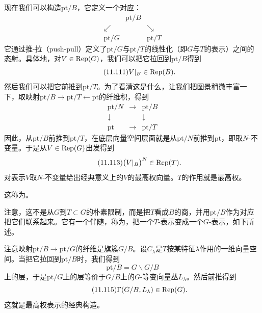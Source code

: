 现在我们可以构造$\mathrm{pt}/B$，它定义一个对应：
\begin{equation}\tag{11.110}
\begin{array}{ccc}
 & \mathrm{pt}/B & \\
 \swarrow & & \searrow\\
 \mathrm{pt}/G & & \mathrm{pt}/T
\end{array}
\end{equation}
它通过推-拉（push-pull）定义了$\mathrm{pt}/G$与$\mathrm{pt}/T$的线性化（即$G$与$T$的表示）之间的态射。具体地，对$V\in\mathrm{Rep}(G)$，我们可以把它拉回到$\mathrm{pt}/B$得到
\begin{equation}\tag{11.111}
V|_{B}\in\mathrm{Rep}(B).
\end{equation}
然后我们可以把它前推到$\mathrm{pt}/T$。为了看清这是什么，让我们把图景稍微丰富一下，取映射$\mathrm{pt}/B\to\mathrm{pt}/T\leftarrow\mathrm{pt}$的纤维积，得到
\begin{equation}\tag{11.112}
\begin{array}{ccc}
\mathrm{pt}/N & \longrightarrow & \mathrm{pt}/B\\
\downarrow & & \downarrow\\
\mathrm{pt} & \longrightarrow & \mathrm{pt}/T
\end{array}
\end{equation}
因此，从$\mathrm{pt}/B$前推到$\mathrm{pt}/T$，在底层向量空间层面就是从$\mathrm{pt}/N$前推到$\mathrm{pt}$，即取$N$-不变量。于是从$V\in\mathrm{Rep}(G)$出发得到
\begin{equation}\tag{11.113}
\bigl(V|_{B}\bigr)^{N}\in\mathrm{Rep}(T).
\end{equation}
对表示$V$取$N$-不变量给出经典意义上的$V$的最高权向量。$T$的作用就是最高权。

这称为。

注意，这不是从$G$到$T\subset G$的朴素限制，而是把$T$看成$B$的商，并用$\mathrm{pt}/B$作为对应把它们联系起来。它有一个伴随，称为，把一个$T$-表示变成一个$G$-表示，如下所述。

注意映射$\mathrm{pt}/B\to\mathrm{pt}/G$的纤维是旗簇$G/B$。设$C_\lambda$是$T$按某特征$\lambda$作用的一维向量空间。当把它拉回到$\mathrm{pt}/B$时，我们得到
\begin{equation}\tag{11.114}
\mathrm{pt}/B=G\backslash G/B
\end{equation}
上的层，于是$\mathrm{pt}/G$上的层等价于$G/B$上的$G$-等变向量丛$L_\lambda$。然后前推得到
\begin{equation}\tag{11.115}
\Gamma(G/B,L_\lambda)\in\mathrm{Rep}(G).
\end{equation}
这就是最高权表示的经典构造。

